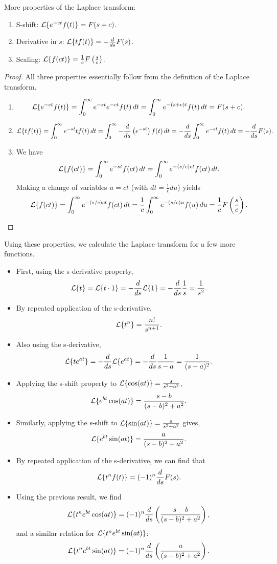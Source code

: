 More properties of the Laplace transform:
\begin{enumerate}
	\item S-shift: $\mathcal{L}\{e^{-ct}f(t)\} = F(s+c)$.
	\item Derivative in $s$: $\mathcal{L}\{tf(t)\} = -\frac{d}{ds}F(s)$.
	\item Scaling: $\mathcal{L}\{f(ct)\} = \frac{1}{c} F\left(\frac{s}{c}\right)$.
\end{enumerate}

\begin{proof}\hfill
	All three properties essentially follow from the definition of the Laplace transform.
	\begin{enumerate}
		\item \[\mathcal{L}\{e^{-ct}f(t)\} = \int_0^{\infty} e^{-st}e^{-ct}f(t) \,dt = \int_0^{\infty} e^{-(s+c)t}f(t) \,dt = F(s+c).\]
		\item \[\mathcal{L}\{tf(t)\} = \int_0^{\infty} e^{-st}tf(t) \,dt = \int_0^{\infty} -\frac{d}{ds}\left(e^{-st}\right) f(t) \,dt = -\frac{d}{ds} \int_0^{\infty} e^{-st}f(t) \,dt = -\frac{d}{ds}F(s).\]
		\item We have
		\[
		\mathcal{L}\{f(ct)\} = \int_0^{\infty} e^{-st}f(ct)\,dt = \int_0^{\infty} e^{-(s/c)ct}f(ct)\,dt.
		\]
		Making a change of variables $u=ct$ (with $dt = \frac{1}{c}du$) yields
		\[
		\mathcal{L}\{f(ct)\} = \int_0^{\infty} e^{-(s/c)ct}f(ct)\,dt = \frac{1}{c} \int_0^{\infty} e^{-(s/c)u}f(u)\,du = \frac{1}{c} F\left(\frac{s}{c}\right).
		\]
	\end{enumerate}
\end{proof}

\begin{eg}
	Using these properties, we calculate the Laplace transform for a few more functions.
	\begin{itemize}
		\item First, using the s-derivative property,
		\[
		\mathcal{L}\{t\} = \mathcal{L}\{t\cdot 1\} = -\frac{d}{ds}\mathcal{L}\{1\} = -\frac{d}{ds} \frac{1}{s} = \frac{1}{s^2}.
		\]
		\item By repeated application of the s-derivative,
		\[
		\mathcal{L}\{t^n\} = \frac{n!}{s^{n+1}}.
		\]
		\item Also using the s-derivative,
		\[
		\mathcal{L}\{te^{at}\} = -\frac{d}{ds} \mathcal{L}\{e^{at}\} = -\frac{d}{ds} \frac{1}{s-a} = \frac{1}{(s-a)^2}.
		\]
		\item Applying the s-shift property to $\mathcal{L}\{\cos(at)\} = \frac{s}{s^2+a^2}$,
		\[
		\mathcal{L}\{e^{bt}\cos(at)\} = \frac{s-b}{(s-b)^2+a^2}.
		\]
		\item Similarly, applying the s-shift to $\mathcal{L}\{\sin(at)\} = \frac{a}{s^2+a^2}$ gives,
		\[
		\mathcal{L}\{e^{bt}\sin(at)\} = \frac{a}{(s-b)^2+a^2}.
		\]
		\item By repeated application of the s-derivative, we can find that
		\[
		\mathcal{L}\{t^nf(t)\} = (-1)^n \frac{d}{ds}F(s).
		\]
		\item Using the previous result, we find
		\[
		\mathcal{L}\{t^ne^{bt}\cos(at)\} = (-1)^n\frac{d}{ds} \left(\frac{s-b}{(s-b)^2+a^2}\right),
		\]
		and a similar relation for $\mathcal{L}\{t^ne^{bt}\sin(at)\}$:
		\[
		\mathcal{L}\{t^ne^{bt}\sin(at)\} = (-1)^n\frac{d}{ds} \left(\frac{a}{(s-b)^2+a^2}\right).
		\]
	\end{itemize}
\end{eg}

